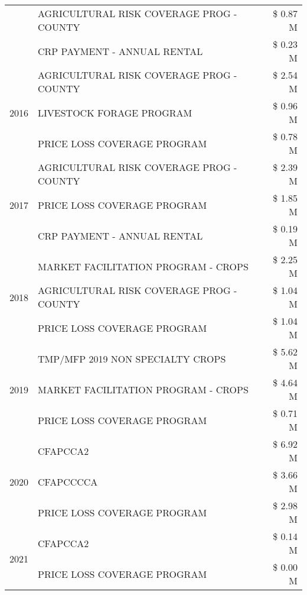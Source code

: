 \begin{tabular}{llr}
 & AGRICULTURAL RISK COVERAGE PROG - COUNTY & \$ 0.87 M \\
 & CRP PAYMENT - ANNUAL RENTAL & \$ 0.23 M \\
\cline{1-3}
\multirow[t]{3}{*}{2016} & AGRICULTURAL RISK COVERAGE PROG - COUNTY & \$ 2.54 M \\
 & LIVESTOCK FORAGE PROGRAM & \$ 0.96 M \\
 & PRICE LOSS COVERAGE PROGRAM & \$ 0.78 M \\
\cline{1-3}
\multirow[t]{3}{*}{2017} & AGRICULTURAL RISK COVERAGE PROG - COUNTY & \$ 2.39 M \\
 & PRICE LOSS COVERAGE PROGRAM & \$ 1.85 M \\
 & CRP PAYMENT - ANNUAL RENTAL & \$ 0.19 M \\
\cline{1-3}
\multirow[t]{3}{*}{2018} & MARKET FACILITATION PROGRAM - CROPS & \$ 2.25 M \\
 & AGRICULTURAL RISK COVERAGE PROG - COUNTY & \$ 1.04 M \\
 & PRICE LOSS COVERAGE PROGRAM & \$ 1.04 M \\
\cline{1-3}
\multirow[t]{3}{*}{2019} & TMP/MFP 2019 NON SPECIALTY CROPS & \$ 5.62 M \\
 & MARKET FACILITATION PROGRAM - CROPS & \$ 4.64 M \\
 & PRICE LOSS COVERAGE PROGRAM & \$ 0.71 M \\
\cline{1-3}
\multirow[t]{3}{*}{2020} & CFAPCCA2 & \$ 6.92 M \\
 & CFAPCCCCA & \$ 3.66 M \\
 & PRICE LOSS COVERAGE PROGRAM & \$ 2.98 M \\
\cline{1-3}
\multirow[t]{2}{*}{2021} & CFAPCCA2 & \$ 0.14 M \\
 & PRICE LOSS COVERAGE PROGRAM & \$ 0.00 M \\
\cline{1-3}
\bottomrule
\end{tabular}
